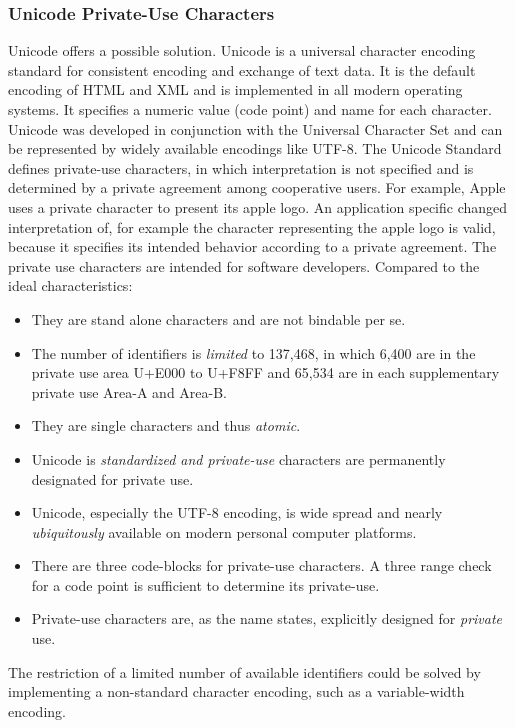 \subsubsection{Unicode Private-Use Characters}
Unicode \cite{Unicode} offers a possible solution. Unicode is a universal character encoding standard for consistent encoding and exchange of text data. It is the default encoding of HTML and XML and is implemented in all modern operating systems. It specifies a numeric value (code point) and name for each character. Unicode was developed in conjunction with the Universal Character Set and can be represented by widely available encodings like UTF-8. The Unicode Standard defines private-use characters, in which interpretation is not specified and is determined by a private agreement among cooperative users. For example, Apple uses a private character to present its apple logo. An application specific changed interpretation of, for example the character representing the apple logo is valid, because it specifies its intended behavior according to a private agreement.
The private use characters are intended for software developers. Compared to the ideal characteristics:
\begin{itemize}
	\item They are stand alone characters and are not bindable per se.
	\item The number of identifiers is \emph{limited} to 137,468, in which 6,400 are in the private use area U+E000 to U+F8FF and 65,534 are in each supplementary private use Area-A and Area-B. 
	\item They are single characters and thus \emph{atomic}. 
	\item Unicode is \emph{standardized and private-use} characters are permanently designated for private use.
	\item Unicode, especially the UTF-8 encoding, is wide spread and nearly \emph{ubiquitously} available on modern personal computer platforms.
	\item There are three code-blocks for private-use characters. A three range check for a code point is sufficient to determine its private-use.
	\item Private-use characters are, as the name states, explicitly designed for \emph{private} use.
\end{itemize}
The restriction of a limited number of available identifiers could be solved by implementing a non-standard character encoding, such as a variable-width encoding.


